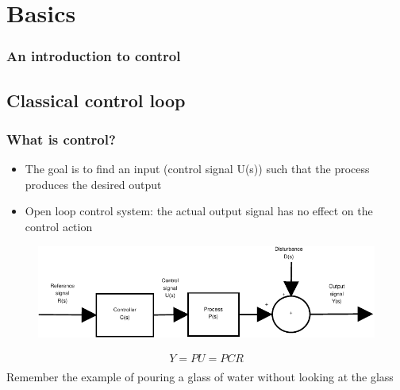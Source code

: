 \section{Basics}
\begin{frame}
\frametitle{An introduction to control}
\end{frame}

\subsection[Classical control loop]{Classical control loop}
\begin{frame}
\frametitle{What is control?}
\begin{itemize}
	\item The goal is to find an input (control signal U(s)) such that the process produces the desired output
	\item Open loop control system: the actual output signal has no effect on the control action
\end{itemize}
\vspace{-1em}
\begin{figure}
	\centering
	\includegraphics[width=0.8\linewidth]{Open-Loop}
	\label{fig:Open-Loop}
\end{figure}
\begin{align*}
	Y = PU = PCR \\
\end{align*}
Remember the example of pouring a glass of water without looking at the glass
\end{frame}

